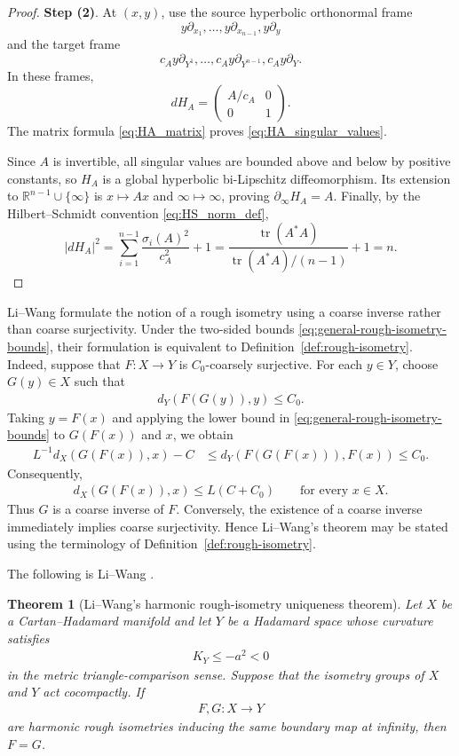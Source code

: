 \documentclass[11pt]{amsart}
\theoremstyle{plain}
\newtheorem{theorem}{Theorem}[section]
\theoremstyle{plain}
\theoremstyle{plain}
\newcommand{\bdry}{\partial_\infty}
\newcommand{\tr}{\operatorname{tr}}
\newcommand{\R}{\mathbb R}
\numberwithin{equation}{section}
\begin{document}
\begin{proof}
\textbf{Step (2)}. At \((x,y)\), use the source hyperbolic orthonormal frame
\[
y\partial_{x_1},\dots,y\partial_{x_{n-1}},y\partial_y
\]
and the target frame
\[
c_Ay\partial_{Y^1},\dots,c_Ay\partial_{Y^{n-1}},c_Ay\partial_Y.
\]
In these frames,
\begin{equation}\label{eq:HA_matrix}
dH_A=
\begin{pmatrix}
A/c_A&0\\
0&1
\end{pmatrix}.
\end{equation}
The matrix formula \eqref{eq:HA_matrix} proves
\eqref{eq:HA_singular_values}.

Since \(A\) is invertible,
all singular values are bounded above and below by positive constants, so
\(H_A\) is a global hyperbolic bi-Lipschitz diffeomorphism.  Its extension
to \(\R^{n-1}\cup\{\infty\}\) is \(x\mapsto Ax\) and
\(\infty\mapsto\infty\), proving \(\bdry H_A=A\).
Finally, by the Hilbert--Schmidt convention
\eqref{eq:HS_norm_def},
\[
|dH_A|^2
=
\sum_{i=1}^{n-1}\frac{\sigma_i(A)^2}{c_A^2}+1
=
\frac{\tr(A^*A)}{\tr(A^*A)/(n-1)}+1
=n.
\]
\end{proof}

Li--Wang formulate the notion of a rough isometry using a coarse inverse
rather than coarse surjectivity.  Under the two-sided bounds
\eqref{eq:general-rough-isometry-bounds}, their formulation is equivalent to
Definition~\ref{def:rough-isometry}.  Indeed, suppose that
\(F:X\to Y\) is
\(C_0\)-coarsely surjective.  For each \(y\in Y\), choose \(G(y)\in X\)
such that
\begin{align}
d_Y(F(G(y)),y)\leq C_0.
\nonumber
\end{align}
Taking \(y=F(x)\) and applying the lower bound in
\eqref{eq:general-rough-isometry-bounds} to \(G(F(x))\) and \(x\), we obtain
\begin{align}
L^{-1}d_X(G(F(x)),x)-C
&\leq d_Y(F(G(F(x))),F(x))
\leq C_0.
\nonumber
\end{align}
Consequently,
\begin{align}
d_X(G(F(x)),x)\leq L(C+C_0)
\qquad\text{for every }x\in X.
\nonumber
\end{align}
Thus \(G\) is a coarse inverse of \(F\).  Conversely, the existence of a
coarse inverse immediately implies coarse surjectivity.  Hence Li--Wang's
theorem may be stated using the terminology of
Definition~\ref{def:rough-isometry}.

The following is Li--Wang \cite[Theorem~2.3, pp.~433--436]{LiWang}.
\begin{theorem}[Li--Wang's harmonic rough-isometry uniqueness theorem]
\label{thm:LiWang_uniqueness}
Let \(X\) be a Cartan--Hadamard manifold and let \(Y\) be a Hadamard space
whose curvature satisfies
\begin{align}
K_Y\leq-a^2<0
\nonumber
\end{align}
in the metric triangle-comparison sense.  Suppose that the isometry groups
of \(X\) and \(Y\) act cocompactly.  If
\begin{align}
F,G:X\longrightarrow Y
\nonumber
\end{align}
are harmonic rough isometries inducing the same boundary map at infinity,
then \(F=G\).
\end{theorem}
\end{document}
